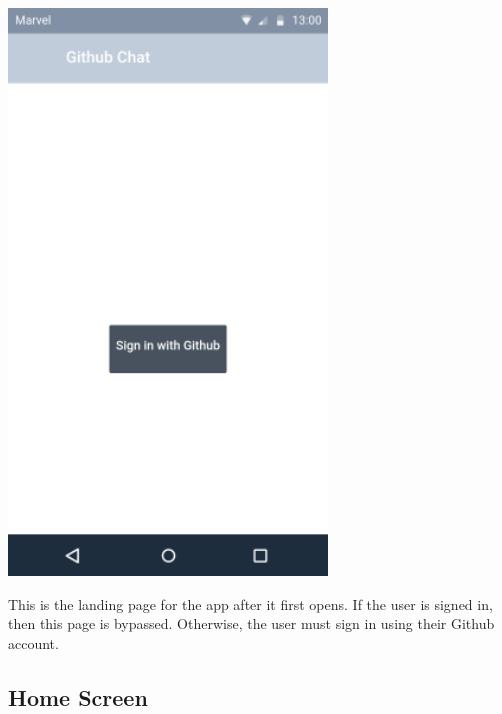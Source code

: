 \documentclass{report}
\begin{document}
\begin{center}
    \includegraphics[scale=0.6]{design-login}
\end{center}
This is the landing page for the app after it first opens. If the user is signed in, then this page is bypassed. Otherwise, the user must sign in using their Github account.

\newpage
\subsection{Home Screen}
\end{document}
